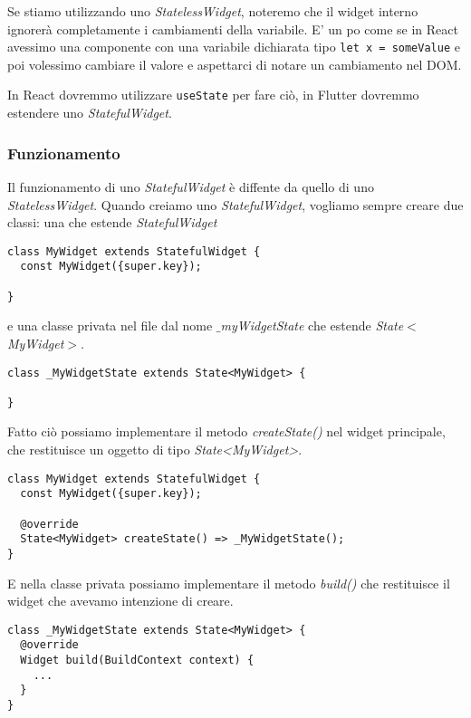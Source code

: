 \documentclass[12pt]{article}
\begin{document}
Se stiamo utilizzando uno \textit{StatelessWidget}, 
noteremo che il widget interno ignorerà completamente
i cambiamenti della variabile. E' un po come se in React
avessimo una componente con una variabile dichiarata tipo
\texttt{let x = someValue} e poi volessimo cambiare il valore e aspettarci di notare un cambiamento nel DOM.

In React dovremmo utilizzare \texttt{useState} per fare ciò, in Flutter dovremmo estendere uno \textit{StatefulWidget}.

\subsubsection{Funzionamento}
Il funzionamento di uno \textit{StatefulWidget} è diffente da quello di uno \textit{StatelessWidget}. Quando creiamo uno \textit{StatefulWidget}, vogliamo sempre creare due classi: una che estende \textit{StatefulWidget} 
\begin{highlight}
\begin{verbatim}
class MyWidget extends StatefulWidget {
  const MyWidget({super.key});

}
\end{verbatim}
\end{highlight}

e una classe privata nel file dal nome \textit{$\_$myWidgetState} che estende \textit{State$<$MyWidget$>$}.

\begin{highlight}
\begin{verbatim}
class _MyWidgetState extends State<MyWidget> {

}
\end{verbatim}
\end{highlight}

Fatto ciò possiamo implementare il metodo \textit{createState()} 
nel widget principale,
che restituisce un oggetto di tipo \textit{State<MyWidget>}.

\begin{highlight}
\begin{verbatim}
class MyWidget extends StatefulWidget {
  const MyWidget({super.key});

  @override
  State<MyWidget> createState() => _MyWidgetState();
}
\end{verbatim}
\end{highlight}

E nella classe privata possiamo implementare il metodo \textit{build()} che restituisce il widget che avevamo intenzione di creare.
\begin{highlight}
\begin{verbatim}
class _MyWidgetState extends State<MyWidget> {
  @override
  Widget build(BuildContext context) {
    ...
  }
}
\end{verbatim}  
\end{highlight}
\end{document}
